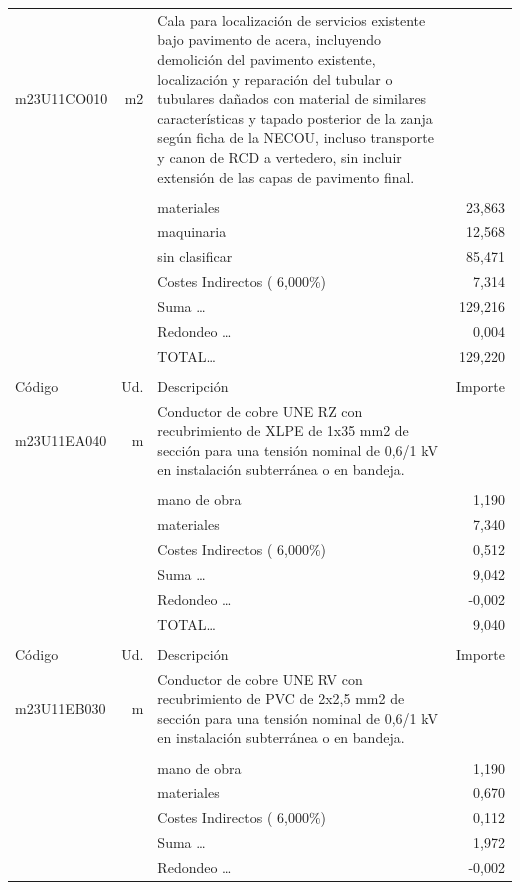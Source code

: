 \begin{supertabular}{l r p{60mm} r}
\hline%
m23U11CO010&m2&Cala para localización de servicios existente bajo pavimento de acera, incluyendo demolición del pavimento existente, localización y reparación del tubular o tubulares dañados con material de similares características y tapado posterior de la zanja según ficha de la NECOU, incluso transporte y canon de RCD a vertedero, sin incluir extensión de las capas de pavimento final.&\\%
&&&\\%
&&materiales&    23,863\\%
&&maquinaria&    12,568\\%
&&sin clasificar&    85,471\\%
&&Costes Indirectos (     6,000\%)&     7,314\\%
&&Suma \ldots&   129,216\\%
&&Redondeo \ldots&     0,004\\%
%
&&TOTAL\ldots&   129,220\\%
&&&\\%
Código&Ud.&Descripción&Importe\\%
\hline%
m23U11EA040&m&Conductor de cobre UNE RZ con recubrimiento de XLPE de 1x35 mm2 de sección para una tensión nominal de 0,6/1 kV en instalación subterránea o en bandeja.&\\%
&&&\\%
&&mano de obra&     1,190\\%
&&materiales&     7,340\\%
&&Costes Indirectos (     6,000\%)&     0,512\\%
&&Suma \ldots&     9,042\\%
&&Redondeo \ldots&    {-}0,002\\%
%
&&TOTAL\ldots&     9,040\\%
&&&\\%
Código&Ud.&Descripción&Importe\\%
\hline%
m23U11EB030&m&Conductor de cobre UNE RV con recubrimiento de PVC de 2x2,5 mm2 de sección para una tensión nominal de 0,6/1 kV en instalación subterránea o en bandeja.&\\%
&&&\\%
&&mano de obra&     1,190\\%
&&materiales&     0,670\\%
&&Costes Indirectos (     6,000\%)&     0,112\\%
&&Suma \ldots&     1,972\\%
&&Redondeo \ldots&    {-}0,002\\%
%

\end{supertabular}
